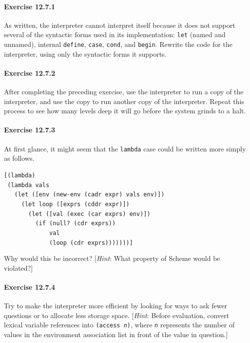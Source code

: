 \paragraph{Exercise \label{examples_g188}12.7.1}


\label{examples_s52}As written, the interpreter cannot interpret itself because it does
not support several of the syntactic forms used in its implementation:
\texttt{let} (named and unnamed), internal \texttt{define}, \texttt{case}, \texttt{cond}, and
\texttt{begin}.
Rewrite the code for the interpreter, using only the syntactic forms
it supports.


\paragraph{Exercise \label{examples_g189}12.7.2}


\label{examples_s53}After completing the preceding exercise,
use the interpreter to run a copy of the interpreter, and use the copy to
run another copy of the interpreter.
Repeat this process to see how many levels deep it will go before the
system grinds to a halt.


\paragraph{Exercise \label{examples_g190}12.7.3}


\label{examples_s54}At first glance, it might seem that the \texttt{lambda} case could be written
more simply as follows.


\begin{alltt}
[(lambda)
 (lambda vals
   (let ([env (new-env (cadr expr) vals env)])
     (let loop ([exprs (cddr expr)])
       (let ([val (exec (car exprs) env)])
         (if (null? (cdr exprs))
             val
             (loop (cdr exprs)))))))]
\end{alltt}


Why would this be incorrect?
[\textit{Hint}: What property of Scheme would be violated?]


\paragraph{Exercise \label{examples_g191}12.7.4}


\label{examples_s55}Try to make the interpreter more efficient by looking for ways to ask
fewer questions or to allocate less storage space.
[\textit{Hint}: Before evaluation, convert lexical variable references into
\texttt{(access \textit{n})}, where \texttt{\textit{n}} represents the number of values
in the environment association list in front of the value in question.]



